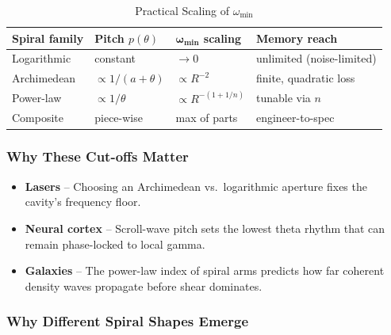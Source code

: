 \begin{table}[H]
  \small
  \centering
  \caption{Practical Scaling of \(\omega_{\min}\)}
  \label{tab:spiral-thumb}
  \begin{tabular}{@{}p{} p{} p{} p{}@{}}
    \toprule
    \textbf{Spiral family}
      & \textbf{Pitch \(p(\theta)\)}
      & \(\boldsymbol{\omega_{\min}}\) \textbf{scaling}
      & \textbf{Memory reach} \\
    \midrule
    Logarithmic   & constant             & \(\to0\)                   & unlimited (noise-limited) \\
    Archimedean   & \(\propto1/(a+\theta)\) & \(\propto R^{-2}\)         & finite, quadratic loss \\
    Power-law     & \(\propto1/\theta\)   & \(\propto R^{-(1+1/n)}\)   & tunable via \(n\) \\
    Composite     & piece-wise            & max of parts               & engineer-to-spec \\
    \bottomrule
  \end{tabular}
\end{table}

\subsubsection{Why These Cut-offs Matter}

\begin{itemize}
  \item \textbf{Lasers} – Choosing an Archimedean vs.\ logarithmic aperture fixes the cavity’s frequency floor.
  \item \textbf{Neural cortex} – Scroll-wave pitch sets the lowest theta rhythm that can remain phase-locked to local gamma.
  \item \textbf{Galaxies} – The power-law index of spiral arms predicts how far coherent density waves propagate before shear dominates.
\end{itemize}

\subsubsection{Why Different Spiral Shapes Emerge}

